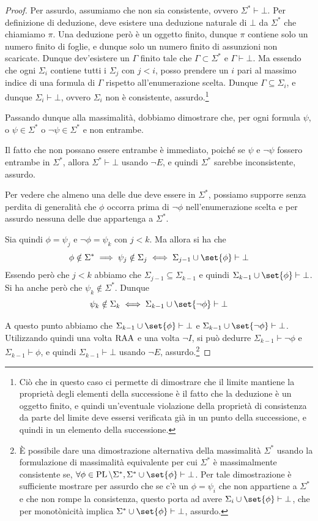 \begin{proof}
  Per assurdo, assumiamo che non sia consistente, ovvero \(\Sigma^*\vdash\bot\). Per definizione di deduzione, deve esistere una deduzione naturale di \(\bot\) da \(\Sigma^*\) che chiamiamo \(\pi\). Una deduzione però è un oggetto finito, dunque \(\pi\) contiene solo un numero finito di foglie, e dunque solo un numero finito di assunzioni non scaricate. Dunque dev'esistere un \(\Gamma\) finito tale che \(\Gamma\subset\Sigma^*\) e \(\Gamma\vdash\bot\). Ma essendo che ogni \(\Sigma_i\) contiene tutti i \(\Sigma_j\) con \(j<i\), posso prendere un \(i\) pari al massimo indice di una formula di \(\Gamma\) rispetto all'enumerazione scelta. Dunque \(\Gamma\subseteq\Sigma_i\), e dunque \(\Sigma_i\vdash\bot\), ovvero \(\Sigma_i\) non è consistente, assurdo.\footnote{Ciò che in questo caso ci permette di dimostrare che il limite mantiene la proprietà degli elementi della successione è il fatto che la deduzione è un oggetto finito, e quindi un'eventuale violazione della proprietà di consistenza da parte del limite deve essersi verificata già in un punto della successione, e quindi in un elemento della successione.}

  Passando dunque alla massimalità, dobbiamo dimostrare che, per ogni formula \(\psi\), o \(\psi\in\Sigma^*\) o \(\neg\psi\in\Sigma^*\) e non entrambe.

  Il fatto che non possano essere entrambe è immediato, poiché se \(\psi\) e \(\neg\psi\) fossero entrambe in \(\Sigma^*\), allora \(\Sigma^*\vdash\bot\) usando \(\neg E\), e quindi \(\Sigma^*\) sarebbe inconsistente, assurdo.

  Per vedere che almeno una delle due deve essere in \(\Sigma^*\), possiamo supporre senza perdita di generalità che \(\phi\) occorra prima di \(\neg\phi\) nell'enumerazione scelta e 
  per assurdo nessuna delle due appartenga a \(\Sigma^*\).

  Sia quindi \(\phi=\psi_j\) e \(\neg\phi=\psi_k\) con \(j<k\).
  Ma allora si ha che
  \[\phi\notin\Sigma^* \implies \psi_j \notin \Sigma_j \iff \Sigma_{j-1}\cup\set{\phi} \vdash \bot\]
  Essendo però che \(j<k\) abbiamo che \(\Sigma_{j-1}\subseteq\Sigma_{k-1}\) e quindi \(\Sigma_{k-1}\cup\set{\phi} \vdash \bot\).
  Si ha anche però che \(\psi_k\notin\Sigma^*\). Dunque
  \[\psi_k \notin \Sigma_k \iff \Sigma_{k-1}\cup\set{\neg\phi}\vdash \bot\]

  A questo punto abbiamo che \(\Sigma_{k-1}\cup\set{\phi}\vdash\bot\) e \(\Sigma_{k-1}\cup\set{\neg\phi}\vdash\bot\). Utilizzando quindi una volta \(\operatorname{RAA}\) e una volta \(\neg I\), si può dedurre \(\Sigma_{k-1}\vdash\neg\phi\) e \(\Sigma_{k-1}\vdash\phi\), e quindi \(\Sigma_{k-1}\vdash\bot\) usando \(\neg E\), assurdo.\footnote{È possibile dare una dimostrazione alternativa della massimalità \(\Sigma^*\) usando la formulazione di massimalità equivalente per cui \(\Sigma^*\) è massimalmente consistente se, \(\forall \phi \in \PL\setminus\Sigma^*, \Sigma^*\cup\set{\phi}\vdash\bot\).
  Per tale dimostrazione è sufficiente mostrare per assurdo che se c'è un \(\phi=\psi_i\) che non appartiene a \(\Sigma^*\) e che non rompe la consistenza, questo porta ad avere \(\Sigma_i\cup\set{\phi}\vdash\bot\), che per monotònicità implica \(\Sigma^*\cup\set{\phi}\vdash\bot\), assurdo.}
\end{proof}

